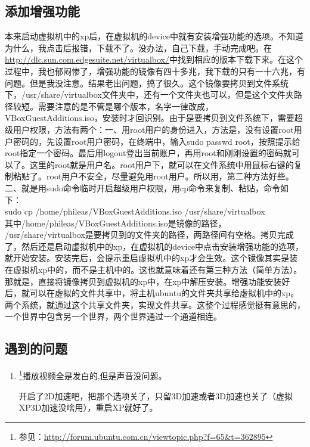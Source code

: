 \subsection{添加增强功能}
    本来启动虚拟机中的xp后，在虚拟机的device中就有安装增强功能的选项。不知道为什么，我点击后报错，下载不了。没办法，自己下载，手动完成吧。在\url{http://dlc.sun.com.edgesuite.net/virtualbox/}中找到相应的版本下载下来。在这个过程中，我也郁闷惨了，增强功能的镜像有四十多兆，我下载的只有一十六兆，有问题。但是我没注意。结果老出问题，搞了很久。这个镜像要拷贝到文件系统下，/usr/share/virtualbox文件夹中，还有一个文件夹也可以，但是这个文件夹路径较短。需要注意的是不管是哪个版本，名字一律改成， VBoxGuestAdditions.iso，安装时才回识别。由于是要拷贝到文件系统下，需要超级用户权限，方法有两个：一、用root用户的身份进入，方法是，没有设置root用户密码的，先设置root用户密码，在终端中，输入sudo passwd root，按照提示给root指定一个密码。最后用logout登出当前账户，再用root和刚刚设置的密码就可以了。这里的root就是用户名。root用户下，就可以在文件系统中用鼠标右键的复制粘贴了。root用户不安全，尽量避免用root用户。所以用，第二种方法好些。二、就是用sudo命令临时开启超级用户权限，用cp命令来复制、粘贴，命令如下：\\
sudo cp /home/phileas/VBoxGuestAdditions.iso /usr/share/virtualbox\\
其中/home/phileas/VBoxGuestAdditions.iso是镜像的路径，\\/usr/share/virtualbox是要拷贝到的文件夹的路径，两路径间有空格。拷贝完成了，然后还是启动虚拟机中的xp，在虚拟机的device中点击安装增强功能的选项，就开始安装。安装完后，会提示重启虚拟机中的xp才会生效。这个镜像其实是装在虚拟机xp中的，而不是主机中的。{\color{red}这也就意味着还有第三种方法（简单方法）。}那就是，直接将镜像拷贝到虚拟机的xp中，在xp中解压安装。增强功能安装好后，就可以在虚拟的文件共享中，将主机ubuntu的文件夹共享给虚拟机中的xp。两个系统，就通过这个共享文件夹，实现文件共享。这整个过程感觉挺有意思的，一个世界中包含另一个世界，两个世界通过一个通道相连。


\subsection{遇到的问题}
\begin{enumerate}
\item \footnote{参见：\url{http://forum.ubuntu.com.cn/viewtopic.php?f=65&t=362895}}播放视频全是发白的,但是声音没问题。

开启了2D加速吧，把那个选项关了，只留3D加速或者3D加速也关了（虚拟XP3D加速没啥用），重启XP就好了。
\end{enumerate}




